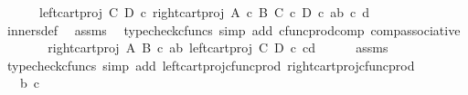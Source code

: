 \begin{isabellebody}
\ \ \ \ \ \ left{\isacharunderscore}{\kern0pt}cart{\isacharunderscore}{\kern0pt}proj\ C\ D\ {\isasymcirc}\isactrlsub c\ right{\isacharunderscore}{\kern0pt}cart{\isacharunderscore}{\kern0pt}proj\ {\isacharparenleft}{\kern0pt}A\ {\isasymtimes}\isactrlsub c\ B{\isacharparenright}{\kern0pt}\ {\isacharparenleft}{\kern0pt}C\ {\isasymtimes}\isactrlsub c\ D{\isacharparenright}{\kern0pt}\ {\isasymcirc}\isactrlsub c\ {\isasymlangle}{\isasymlangle}a{\isacharcomma}{\kern0pt}b{\isasymrangle}{\isacharcomma}{\kern0pt}\ {\isasymlangle}c{\isacharcomma}{\kern0pt}\ d{\isasymrangle}{\isasymrangle}{\isasymrangle}{\isachardoublequoteclose}\isanewline
\ \ \ \ \isamarkupfalse%
\ inners{\isacharunderscore}{\kern0pt}def\ \isamarkupfalse%
\ assms\ \isamarkupfalse%
\ {\isacharparenleft}{\kern0pt}typecheck{\isacharunderscore}{\kern0pt}cfuncs{\isacharcomma}{\kern0pt}\ simp\ add{\isacharcolon}{\kern0pt}\ cfunc{\isacharunderscore}{\kern0pt}prod{\isacharunderscore}{\kern0pt}comp\ comp{\isacharunderscore}{\kern0pt}associative{}{\isacharparenright}{\kern0pt}\isanewline
\ \ \isamarkupfalse%
\ \isamarkupfalse%
\ {\isachardoublequoteopen}{\isachardot}{\kern0pt}{\isachardot}{\kern0pt}{\isachardot}{\kern0pt}\ {\isacharequal}{\kern0pt}\ {\isasymlangle}right{\isacharunderscore}{\kern0pt}cart{\isacharunderscore}{\kern0pt}proj\ A\ B\ {\isasymcirc}\isactrlsub c\ {\isasymlangle}a{\isacharcomma}{\kern0pt}b{\isasymrangle}{\isacharcomma}{\kern0pt}\ left{\isacharunderscore}{\kern0pt}cart{\isacharunderscore}{\kern0pt}proj\ C\ D\ {\isasymcirc}\isactrlsub c\ {\isasymlangle}c{\isacharcomma}{\kern0pt}d{\isasymrangle}{\isasymrangle}{\isachardoublequoteclose}\isanewline
\ \ \ \ \isamarkupfalse%
\ assms\ \isamarkupfalse%
\ {\isacharparenleft}{\kern0pt}typecheck{\isacharunderscore}{\kern0pt}cfuncs{\isacharcomma}{\kern0pt}\ simp\ add{\isacharcolon}{\kern0pt}\ left{\isacharunderscore}{\kern0pt}cart{\isacharunderscore}{\kern0pt}proj{\isacharunderscore}{\kern0pt}cfunc{\isacharunderscore}{\kern0pt}prod\ right{\isacharunderscore}{\kern0pt}cart{\isacharunderscore}{\kern0pt}proj{\isacharunderscore}{\kern0pt}cfunc{\isacharunderscore}{\kern0pt}prod{\isacharparenright}{\kern0pt}\isanewline
\ \ \isamarkupfalse%
\ \isamarkupfalse%
\ {\isachardoublequoteopen}{\isachardot}{\kern0pt}{\isachardot}{\kern0pt}{\isachardot}{\kern0pt}\ {\isacharequal}{\kern0pt}\ {\isasymlangle}b{\isacharcomma}{\kern0pt}\ c{\isasymrangle}{\isachardoublequoteclose}\isanewline
\ \ \ \ \isamarkupfalse%

\end{isabellebody}
